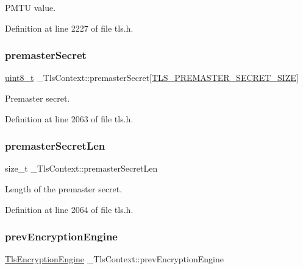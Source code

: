 P\+M\+TU value. 



Definition at line 2227 of file tls.\+h.

\mbox{\label{struct__TlsContext_af4cf43203ab85e0ecf88475fade1ac80}} 
\subsubsection{\texorpdfstring{premaster\+Secret}{premasterSecret}}
{\footnotesize\ttfamily \hyperlink{stdint_8h_aba7bc1797add20fe3efdf37ced1182c5}{uint8\+\_\+t} \+\_\+\+Tls\+Context\+::premaster\+Secret\mbox{[}\hyperlink{tls_8h_ab57dd89b36996f086e46d778395375c3}{T\+L\+S\+\_\+\+P\+R\+E\+M\+A\+S\+T\+E\+R\+\_\+\+S\+E\+C\+R\+E\+T\+\_\+\+S\+I\+ZE}\mbox{]}}



Premaster secret. 



Definition at line 2063 of file tls.\+h.

\mbox{\label{struct__TlsContext_ae3cc4854b99087709a6247879e5cdf6c}} 
\subsubsection{\texorpdfstring{premaster\+Secret\+Len}{premasterSecretLen}}
{\footnotesize\ttfamily size\+\_\+t \+\_\+\+Tls\+Context\+::premaster\+Secret\+Len}



Length of the premaster secret. 



Definition at line 2064 of file tls.\+h.

\mbox{\label{struct__TlsContext_ac0cefbab1e25255c34e83796d8f62a09}} 
\subsubsection{\texorpdfstring{prev\+Encryption\+Engine}{prevEncryptionEngine}}
{\footnotesize\ttfamily \hyperlink{structTlsEncryptionEngine}{Tls\+Encryption\+Engine} \+\_\+\+Tls\+Context\+::prev\+Encryption\+Engine}



